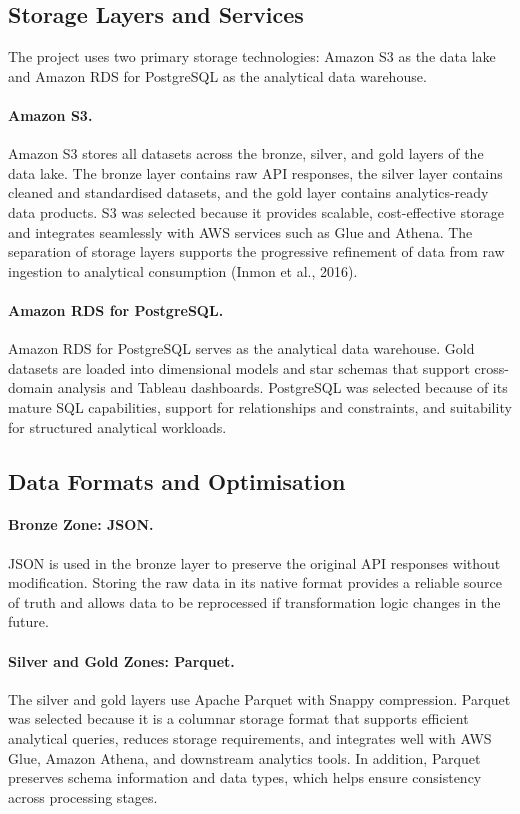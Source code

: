 \documentclass[11pt,a4paper]{article}
\begin{document}
\subsection{Storage Layers and Services}
\label{sec:storage_layers}

The project uses two primary storage technologies: Amazon S3 as the
data lake and Amazon RDS for PostgreSQL as the analytical data
warehouse.

\paragraph{Amazon S3.}
Amazon S3 stores all datasets across the bronze, silver, and gold
layers of the data lake. The bronze layer contains raw API responses,
the silver layer contains cleaned and standardised datasets, and the
gold layer contains analytics-ready data products. S3 was selected
because it provides scalable, cost-effective storage and integrates
seamlessly with AWS services such as Glue and Athena. The separation of storage layers supports the
progressive refinement of data from raw ingestion to analytical
consumption (Inmon et al., 2016).

\paragraph{Amazon RDS for PostgreSQL.}
Amazon RDS for PostgreSQL serves as the analytical data warehouse. Gold
datasets are loaded into dimensional models and star schemas that
support cross-domain analysis and Tableau dashboards. PostgreSQL was
selected because of its mature SQL capabilities, support for
relationships and constraints, and suitability for structured
analytical workloads.

\subsection{Data Formats and Optimisation}
\label{sec:data_formats}

\paragraph{Bronze Zone: JSON.}
JSON is used in the bronze layer to preserve the original API responses
without modification. Storing the raw data in its native format
provides a reliable source of truth and allows data to be reprocessed
if transformation logic changes in the future.

\paragraph{Silver and Gold Zones: Parquet.}
The silver and gold layers use Apache Parquet with Snappy compression.
Parquet was selected because it is a columnar storage format that
supports efficient analytical queries, reduces storage requirements,
and integrates well with AWS Glue, Amazon Athena, and downstream
analytics tools. In addition, Parquet preserves schema information and
data types, which helps ensure consistency across processing stages.
\end{document}
